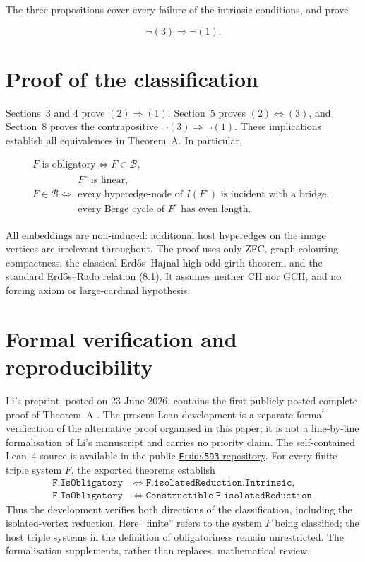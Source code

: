 \documentclass[a4paper,11pt,reqno]{amsart}
\theoremstyle{plain}
\theoremstyle{definition}
\theoremstyle{remark}
\begin{document}
The three propositions cover every failure of the intrinsic conditions, and prove

\[
\neg(3)\Longrightarrow\neg(1). \tag{8.2}
\]

\section{Proof of the classification}\label{conclusion}

Sections~3 and 4 prove \((2)\Longrightarrow(1)\). Section~5 proves
\((2)\Longleftrightarrow(3)\), and Section~8 proves the contrapositive
\(\neg(3)\Longrightarrow\neg(1)\). These implications establish all
equivalences in Theorem~A. In particular,

\begingroup\small
\[
\begin{gathered}
F\text{ is obligatory}
\iff
F\in\mathcal B,\\[1mm]
F\in\mathcal B
\iff
\begin{array}{l}
F^\circ\text{ is linear},\\[1mm]
\text{every hyperedge-node of }I(F^\circ)
\text{ is incident with a bridge},\\[1mm]
\text{every Berge cycle of }F^\circ\text{ has even length}.
\end{array}
\end{gathered}
\]
\endgroup

All embeddings are non-induced: additional host hyperedges on the image vertices are irrelevant throughout. The proof uses only ZFC, graph-colouring compactness, the classical Erd\H{o}s--Hajnal high-odd-girth theorem, and the standard Erd\H{o}s--Rado relation (8.1). It assumes neither CH nor GCH, and no forcing axiom or large-cardinal hypothesis.

\section*{Formal verification and reproducibility}

Li's preprint, posted on 23 June 2026, contains the first publicly posted
complete proof of Theorem~A \citep[Theorem~1.1]{li2026}.  The present Lean
development is a separate formal verification of the alternative proof
organised in this paper; it is not a line-by-line formalisation of Li's
manuscript and carries no priority claim.  The
self-contained Lean~4 source is available in the public
\href{https://github.com/SamPetkov/Erdos593/blob/main/formalization/Erdos593SelfContained.lean}{\texttt{Erdos593} repository}.
For every finite triple system $F$, the exported theorems establish
\[
\begin{aligned}
\mathtt{F.IsObligatory}
&\Longleftrightarrow \mathtt{F.isolatedReduction.Intrinsic},\\
\mathtt{F.IsObligatory}
&\Longleftrightarrow \mathtt{Constructible\ F.isolatedReduction}.
\end{aligned}
\]
Thus the development verifies both directions of the classification,
including the isolated-vertex reduction.  Here ``finite'' refers to the
system $F$ being classified; the host triple systems in the definition of
obligatoriness remain unrestricted.  The formalisation supplements, rather
than replaces, mathematical review.
\end{document}
